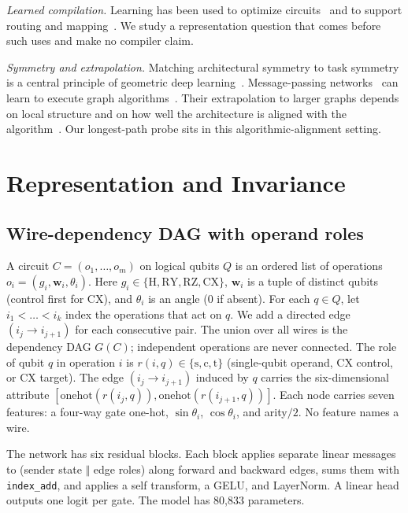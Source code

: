 \documentclass[conference,a4paper]{IEEEtran}
\begin{document}
\emph{Learned compilation.} Learning has been used to optimize circuits~\cite{fosel2021circuitrl} and to support routing and mapping~\cite{li2019tackling,cowtan2019qubit,preskill2018nisq}. We study a representation question that comes before such uses and make no compiler claim.

\emph{Symmetry and extrapolation.} Matching architectural symmetry to task symmetry is a central principle of geometric deep learning~\cite{bronstein2021geometric,battaglia2018relational,zaheer2017deepsets}. Message-passing networks~\cite{gilmer2017mpnn,kipf2017gcn} can learn to execute graph algorithms~\cite{velickovic2020neural}. Their extrapolation to larger graphs depends on local structure and on how well the architecture is aligned with the algorithm~\cite{yehudai2021size,xu2021extrapolate}. Our longest-path probe sits in this algorithmic-alignment setting.

\section{Representation and Invariance}

\subsection{Wire-dependency DAG with operand roles}
A circuit $C=(o_1,\dots,o_m)$ on logical qubits $Q$ is an ordered list of operations $o_i=(g_i,\mathbf{w}_i,\theta_i)$. Here $g_i\in\{\mathrm{H},\mathrm{RY},\mathrm{RZ},\mathrm{CX}\}$, $\mathbf{w}_i$ is a tuple of distinct qubits (control first for CX), and $\theta_i$ is an angle (0 if absent). For each $q\in Q$, let $i_1<\dots<i_k$ index the operations that act on $q$. We add a directed edge $(i_j\to i_{j+1})$ for each consecutive pair. The union over all wires is the dependency DAG $G(C)$; independent operations are never connected. The role of qubit $q$ in operation $i$ is $r(i,q)\in\{\mathrm{s},\mathrm{c},\mathrm{t}\}$ (single-qubit operand, CX control, or CX target). The edge $(i_j\to i_{j+1})$ induced by $q$ carries the six-dimensional attribute $[\mathrm{onehot}(r(i_j,q)),\mathrm{onehot}(r(i_{j+1},q))]$. Each node carries seven features: a four-way gate one-hot, $\sin\theta_i$, $\cos\theta_i$, and arity$/2$. No feature names a wire.

The network has six residual blocks. Each block applies separate linear messages to (sender state $\Vert$ edge roles) along forward and backward edges, sums them with \texttt{index\_add}, and applies a self transform, a GELU, and LayerNorm. A linear head outputs one logit per gate. The model has 80,833 parameters.
\end{document}
